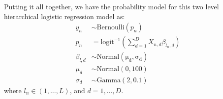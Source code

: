 \documentclass[12pt]{article}
\def\eqa{\left(\sum \limits_{d=1}^D X_{n,d}\beta_{l_n,d} \right)}
\begin{document}
Putting it all together, we have the probability model for this two level hierarchical logistic regression model as:
\begin{align*}
  y_n &\sim \mathrm{Bernoulli}\left(p_n\right) \\
  p_n &= \mathrm{logit}^{-1}\eqa \\
  \beta_{l,d} &\sim \mathrm{Normal\left(\mu_d, \sigma_d \right)}\\
  \mu_d &\sim \mathrm{Normal}\left(0,100 \right)\\
  \sigma_d &\sim \mathrm{Gamma}\left(2, 0.1\right)   
\end{align*}
where $l_n \in \left(1,\ldots,L \right)$, and $d=1,\ldots,D$.
\end{document}
